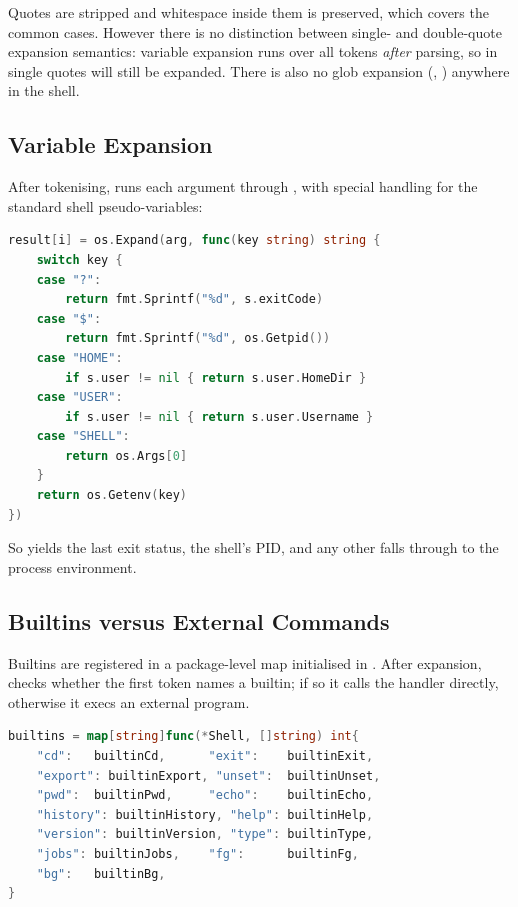 \begin{notebox}
Quotes are stripped and whitespace inside them is preserved, which covers the
common cases. However there is no distinction between single- and double-quote
expansion semantics: variable expansion runs over all tokens \emph{after}
parsing, so  in single quotes will still be expanded. There is
also no glob expansion (\code{*}, ) anywhere in the shell.
\end{notebox}

\subsection{Variable Expansion}

After tokenising,  runs each argument through
, with special handling for the standard shell pseudo-variables:

\begin{lstlisting}[language=Go, caption={Environment and special-variable expansion (shell/shell.go)}]
result[i] = os.Expand(arg, func(key string) string {
    switch key {
    case "?":
        return fmt.Sprintf("%d", s.exitCode)
    case "$":
        return fmt.Sprintf("%d", os.Getpid())
    case "HOME":
        if s.user != nil { return s.user.HomeDir }
    case "USER":
        if s.user != nil { return s.user.Username }
    case "SHELL":
        return os.Args[0]
    }
    return os.Getenv(key)
})
\end{lstlisting}

So  yields the last exit status, \code{\$\$} the shell's PID, and any
other  falls through to the process environment.

\subsection{Builtins versus External Commands}

Builtins are registered in a package-level map initialised in .
After expansion,  checks whether the first token names a
builtin; if so it calls the handler directly, otherwise it execs an external
program.

\begin{lstlisting}[language=Go, caption={The builtin registry (shell/shell.go)}]
builtins = map[string]func(*Shell, []string) int{
    "cd":   builtinCd,      "exit":    builtinExit,
    "export": builtinExport, "unset":  builtinUnset,
    "pwd":  builtinPwd,     "echo":    builtinEcho,
    "history": builtinHistory, "help": builtinHelp,
    "version": builtinVersion, "type": builtinType,
    "jobs": builtinJobs,    "fg":      builtinFg,
    "bg":   builtinBg,
}
\end{lstlisting}

